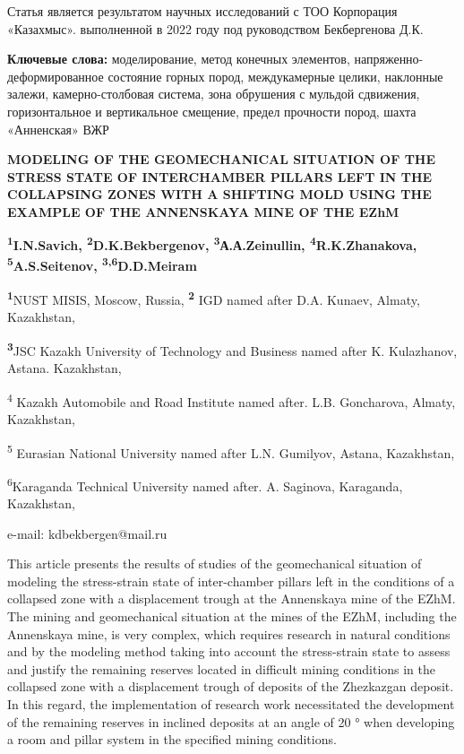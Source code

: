 Статья является результатом научных исследований с ТОО Корпорация
«Казахмыс». выполненной в 2022 году под руководством Бекбергенова Д.К.

{\bfseries Ключевые слова:} моделирование, метод конечных элементов,
напряженно-деформированное состояние горных пород, междукамерные целики,
наклонные залежи, камерно-столбовая система, зона обрушения с мульдой
сдвижения, горизонтальное и вертикальное смещение, предел прочности
пород, шахта «Анненская» ВЖР

\begin{articleheader}

{\bfseries MODELING OF THE GEOMECHANICAL SITUATION OF THE STRESS STATE OF
INTERCHAMBER PILLARS LEFT IN THE COLLAPSING ZONES WITH A SHIFTING MOLD USING THE EXAMPLE OF THE ANNENSKAYA MINE OF THE EZhM}

{\bfseries \textsuperscript{1}I.N.Savich,
\textsuperscript{2}D.K.Bekbergenov\textsuperscript{\envelope },
\textsuperscript{3}А.А.Zeinullin, \textsuperscript{4}R.K.Zhanakova,
\textsuperscript{5}A.S.Seitenov, \textsuperscript{3,6}D.D.Meiram}
\end{articleheader}
\begin{affiliation}

{\bfseries \textsuperscript{1}}NUST MISIS, Moscow, Russia,
{\bfseries \textsuperscript{2}} IGD named after D.A. Kunaev, Almaty,
Kazakhstan,

{\bfseries \textsuperscript{3}}JSC Kazakh University of Technology and
Business named after K. Kulazhanov, Astana. Kazakhstan,

\textsuperscript{4} Kazakh Automobile and Road Institute named after.
L.B. Goncharova, Almaty, Kazakhstan,

\textsuperscript{5} Eurasian National University named after L.N.
Gumilyov, Astana, Kazakhstan,

\textsuperscript{6}Karaganda Technical University named after. A.
Saginova, Karaganda, Kazakhstan,

e-mail: kdbekbergen@mail.ru
\end{affiliation}

This article presents the results of studies of the geomechanical
situation of modeling the stress-strain state of inter-chamber pillars
left in the conditions of a collapsed zone with a displacement trough at
the Annenskaya mine of the EZhM. The mining and geomechanical situation
at the mines of the EZhM, including the Annenskaya mine, is very
complex, which requires research in natural conditions and by the
modeling method taking into account the stress-strain state to assess
and justify the remaining reserves located in difficult mining
conditions in the collapsed zone with a displacement trough of deposits
of the Zhezkazgan deposit. In this regard, the implementation of
research work necessitated the development of the remaining reserves in
inclined deposits at an angle of 20 ° when developing a room and pillar
system in the specified mining conditions.


